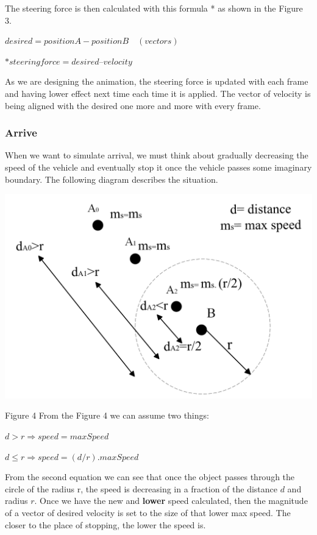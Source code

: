 \documentclass[10pt,twoside,english,a4paper]{article}
\begin{document}
The steering force is then calculated with this formula * as shown 
in the Figure 3.

\begin{center}
$desired =position A - position B \quad (vectors)$ \par
$ *steering force= desired – velocity$

\end{center}

As we are designing the animation, the steering force is updated with 
each frame and having lower effect next time each time it is applied. 
The vector of velocity is being aligned with the desired one
more and more with every frame.

\subsubsection{Arrive} \label{arrive}

When we want to simulate arrival, we must think about gradually 
decreasing the speed of the vehicle and eventually stop it once the 
vehicle passes some imaginary boundary. The following diagram describes 
the situation. 

\includegraphics[scale=0.22]{diagram_radius.png}\par
Figure 4
\bigbreak
From the Figure 4 we can assume two things: 

\begin{center}
$d>r 	\Rightarrow speed = maxSpeed$ \par 
$d \leq r \Rightarrow speed = (d/r)  . maxSpeed$ 
\end{center} 

From the second equation we can see that once the object passes through
the circle of the radius r, the speed is decreasing in a fraction of 
the distance $d$ and radius $r$. Once we have the new and \textbf{lower} 
speed calculated, then the magnitude of a vector of desired velocity is set
to the size of that lower max speed. The closer to the place of stopping,
the lower the speed is.
\end{document}
